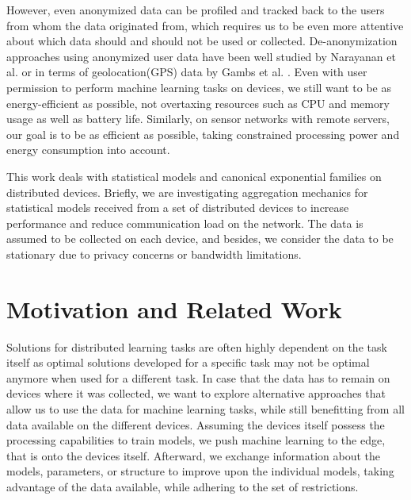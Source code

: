 However, even anonymized data can be profiled and tracked back to the users from whom the data originated from, which requires us to be even more attentive about which data should and should not be used or collected. 
De-anonymization approaches using anonymized user data have been well studied by Narayanan et al. \cite{narayanan2008robust} or in terms of geolocation(GPS) data by Gambs et al. \cite{gambs2014anonymization}.
Even with user permission to perform machine learning tasks on devices, we still want to be as energy-efficient as possible, not overtaxing resources such as CPU and memory usage as well as battery life.
Similarly, on sensor networks with remote servers, our goal is to be as efficient as possible, taking constrained processing power and energy consumption into account.

This work deals with statistical models and canonical exponential families on distributed devices.
Briefly, we are investigating aggregation mechanics for statistical models received from a set of distributed devices to increase performance and reduce communication load on the network.
The data is assumed to be collected on each device, and besides, we consider the data to be stationary due to privacy concerns or bandwidth limitations.

\section{Motivation and Related Work}
 
Solutions for distributed learning tasks are often highly dependent on the task itself as optimal solutions developed for a specific task may not be optimal anymore when used for a different task.
In case that the data has to remain on devices where it was collected, we want to explore alternative approaches that allow us to use the data for machine learning tasks, while still benefitting from all data available on the different devices.
Assuming the devices itself possess the processing capabilities to train models, we push machine learning to the edge, that is onto the devices itself.
Afterward, we exchange information about the models, parameters, or structure to improve upon the individual models, taking advantage of the data available, while adhering to the set of restrictions.

